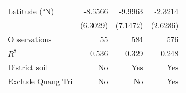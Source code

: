 {\begin{tabular}{l*{3}{D{.}{.}{-1}}}
\addlinespace
Latitude (°N)       &     -8.6566         &     -9.9963         &     -2.3214         \\
                    &    (6.3029)         &    (7.1472)         &    (2.6286)         \\
\midrule
Observations        &          55         &         584         &         576         \\
\(R^{2}\)           &       0.536         &       0.329         &       0.248         \\
District soil       &          No         &         Yes         &         Yes         \\
Exclude Quang Tri   &          No         &          No         &         Yes         \\
\bottomrule
\end{tabular}
}
